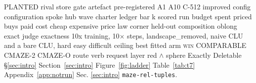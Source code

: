 
\noindent PLANTED rival store gate artefact pre-registered A1 A10 C-512 improved config configuration spoke hub wave
charter ledger bar k scored run budget spent priced buys paid cost cheap expensive price law corner held-out
composition oblong exact judge exactness 10x training, 10$\times$ steps, landscape\_removed, naive CLU and a bare CLU,
hard easy difficult ceiling best fitted arm \textsc{win} COMPARABLE CMAZE-2 CMAZE-O route verb request layer
red $\wedge$ sphere Exactly Deletable \S\ref{sec:intro} Section~\ref{sec:intro} Figure~\ref{fig:ladder}
Table~\ref{tab:t7} Appendix~\ref{app:notrun} Sec. \ref{sec:intro} \texttt{maze-rel-tuples}.
  

